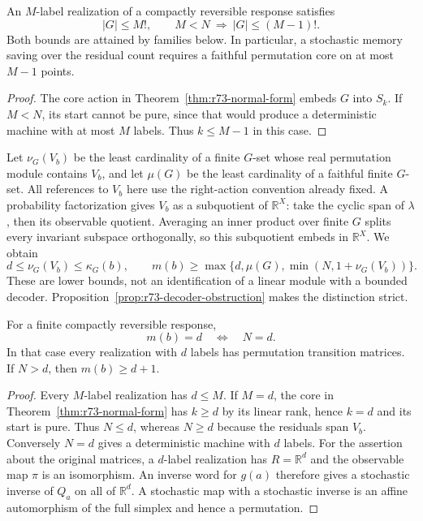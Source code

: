 \begin{corollary}\label{cor:r73-group-bound}
An $M$-label realization of a compactly reversible response satisfies
\[
 |G|\le M!,\qquad
 M<N\ \Longrightarrow\ |G|\le(M-1)!.
\]
Both bounds are attained by families below. In particular, a stochastic
memory saving over the residual count requires a faithful permutation core
on at most $M-1$ points.
\end{corollary}
\begin{proof}
The core action in Theorem~\ref{thm:r73-normal-form} embeds $G$ into $S_k$.
If $M<N$, its start cannot be pure, since that would produce a deterministic
machine with at most $M$ labels. Thus $k\le M-1$ in this case.
\end{proof}

Let $\nu_G(V_b)$ be the least cardinality of a finite $G$-set whose real
permutation module contains $V_b$, and let $\mu(G)$ be the least cardinality
of a faithful finite $G$-set. All references to $V_b$ here use the right-action
convention already fixed. A probability factorization gives $V_b$ as a
subquotient of $\mathbb R^X$: take the cyclic span of $\lambda$, then its
observable quotient. Averaging an inner product over finite $G$ splits every
invariant subspace orthogonally, so this subquotient embeds in
$\mathbb R^X$. We obtain
\begin{equation}\label{eq:r73-module-bounds}
 d\le\nu_G(V_b)\le\kappa_G(b),\qquad
 m(b)\ge\max\{d,\mu(G),\min(N,1+\nu_G(V_b))\}.
\end{equation}
These are lower bounds, not an identification of a linear module with a
bounded decoder. Proposition~\ref{prop:r73-decoder-obstruction} makes the
distinction strict.

\begin{corollary}\label{cor:r73-rank-rigidity}
For a finite compactly reversible response,
\[
 m(b)=d\quad\Longleftrightarrow\quad N=d.
\]
In that case every realization with $d$ labels has permutation transition
matrices. If $N>d$, then $m(b)\ge d+1$.
\end{corollary}
\begin{proof}
Every $M$-label realization has $d\le M$. If $M=d$, the core in
Theorem~\ref{thm:r73-normal-form} has $k\ge d$ by its linear rank, hence
$k=d$ and its start is pure. Thus $N\le d$, whereas $N\ge d$ because the
residuals span $V_b$. Conversely $N=d$ gives a deterministic machine with
$d$ labels. For the assertion about the original matrices, a $d$-label
realization has $R=\mathbb R^d$ and the observable map $\pi$ is an
isomorphism. An inverse word for $g(a)$ therefore gives a stochastic inverse
of $Q_a$ on all of $\mathbb R^d$. A stochastic map with a stochastic inverse
is an affine automorphism of the full simplex and hence a permutation.
\end{proof}

